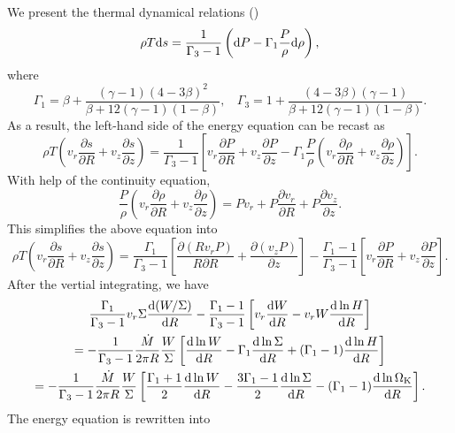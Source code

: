 \documentclass[oneside]{book}
\def\rd{{\rm d}}
\begin{document}
We present the thermal dynamical relations (\citealt{Kato2008})
\begin{equation}
\rho T \rd s=\frac{1}{\Gamma_3-1}\left(\rd P -\Gamma_1\frac{P}{\rho}\rd \rho\right),
\end{equation}
where 
\begin{equation}
\Gamma_1=\beta + \frac{(\gamma-1)(4-3\beta)^2}{\beta + 12(\gamma-1)(1-\beta)},~~~~
\Gamma_3=1+\frac{(4-3\beta)(\gamma-1)}{\beta + 12(\gamma-1)(1-\beta)}.
\end{equation}
As a result, the left-hand side of the energy equation can be recast as
\begin{equation}
 \rho T\left(v_r\frac{\partial s}{\partial R}+v_z\frac{\partial s}{\partial z}\right)
 =\frac{1}{\Gamma_3-1}\left[v_r\frac{\partial P}{\partial R} + v_z\frac{\partial P}{\partial z}
 -\Gamma_1\frac{P}{\rho}\left(v_r\frac{\partial \rho}{\partial R} + v_z\frac{\partial \rho}{\partial z}\right)\right].
\end{equation}
With help of the continuity equation, 
\begin{equation}
\frac{P}{\rho}\left(v_r\frac{\partial \rho}{\partial R} + v_z\frac{\partial \rho}{\partial z}\right)
=Pv_r+P\frac{\partial v_r}{\partial R} + P \frac{\partial v_z}{\partial z}.
\end{equation}
This simplifies the above equation into
\begin{equation}
 \rho T\left(v_r\frac{\partial s}{\partial R}+v_z\frac{\partial s}{\partial z}\right)
 =\frac{\Gamma_1}{\Gamma_3-1}\left[\frac{\partial (Rv_rP)}{R\partial R} +
 \frac{\partial (v_zP)}{\partial z}\right]
 -\frac{\Gamma_1-1}{\Gamma_3-1}\left[v_r\frac{\partial P}{\partial R}+v_z\frac{\partial P}{\partial z}\right].
\end{equation}
After the vertial integrating, we have 
\begin{gather}
\frac{\Gamma_1}{\Gamma_3-1}v_r\Sigma\frac{\rd (W/\Sigma)}{\rd R}
-\frac{\Gamma_1-1}{\Gamma_3-1}\left[v_r\frac{\rd W}{\rd R}-v_rW\frac{\rd\ln H}{\rd R}\right]\\
=-\frac{1}{\Gamma_3-1}\frac{\dot M}{2\pi R}\frac{W}{\Sigma}
\left[\frac{\rd \ln W}{\rd R} -\Gamma_1\frac{\rd \ln \Sigma}{\rd R}+(\Gamma_1-1)\frac{\rd\ln H}{\rd R}\right]\\
=-\frac{1}{\Gamma_3-1}\frac{\dot M}{2\pi R}\frac{W}{\Sigma}
\left[\frac{\Gamma_1+1}{2}\frac{\rd \ln W}{\rd R}-
\frac{3\Gamma_1-1}{2}\frac{\rd \ln \Sigma}{\rd R}
-(\Gamma_1-1)\frac{\rd\ln\Omega_{\rm K}}{\rd R}\right].
\end{gather}
The energy equation is rewritten into
\end{document}
